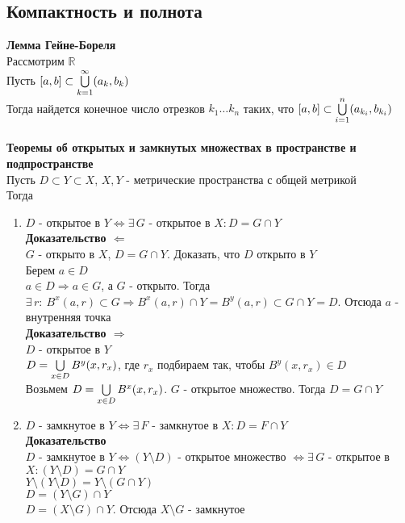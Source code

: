\documentclass[12pt]{article}
\begin{document}
\subsection{Компактность и полнота}
\textbf{Лемма Гейне-Бореля}\\
Рассмотрим $\mathbb{R}$\\
Пусть $[a,b] \subset \bigcup\limits_{k=1}^\infty (a_k,b_k)$\\
Тогда найдется конечное число отрезков $k_1\ldots k_n$ таких, что $[a,b] \subset \bigcup\limits_{i=1}^n (a_{k_i}, b_{k_i})$\\\\
\textbf{Теоремы об открытых и замкнутых множествах в пространстве и подпространстве}\\
Пусть $D \subset Y \subset X$, $X,Y$ - метрические пространства с общей метрикой\\
Тогда
\begin{enumerate}
    \item $D$ - открытое в $Y \Leftrightarrow \exists\,G$ - открытое в $X: D=G\cap Y$\\
    \textbf{Доказательство $\Leftarrow$}\\
    $G$ - открыто в $X$, $D = G\cap Y$. Доказать, что $D$ открыто в $Y$\\
    Берем $a\in D$\\
    $a \in D \Rightarrow a \in G$, а $G$ - открыто. Тогда $\exists\,r:\ B^x(a,r) \subset G \Rightarrow B^x(a,r)\cap Y = B^y(a,r) \subset G\cap Y = D$. Отсюда $a$ - внутренняя точка\\
    \textbf{Доказательство $\Rightarrow$}\\
    $D$ - открытое в $Y$\\
    $D=\bigcup\limits_{x\in D} B^y(x,r_x)$, где $r_x$ подбираем так, чтобы $B^y(x,r_x) \in D$\\
    Возьмем $D=\bigcup\limits_{x\in D} B^x(x,r_x)$. $G$ - открытое множество. Тогда $D = G\cap Y$
    \item $D$ - замкнутое в $Y \Leftrightarrow \exists\,F$ - замкнутое в $X: D=F\cap Y$\\
    \textbf{Доказательство}\\
    $D$ - замкнутое в $Y \Leftrightarrow (Y\setminus D)$ - открытое множество $\Leftrightarrow \exists\,G$ - открытое в $X: (Y\setminus D) = G\cap Y$\\
    $Y\setminus(Y\setminus D) = Y\setminus(G\cap Y)$\\
    $D = (Y\setminus G)\cap Y$\\
    $D = (X\setminus G) \cap Y$. Отсюда $X \setminus G$ - замкнутое
\end{enumerate}
\end{document}
